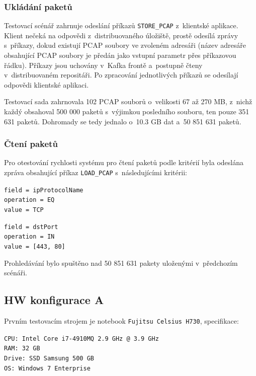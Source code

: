 \subsubsection{Ukládání paketů}
Testovací scénář zahrnuje odeslání příkazů \texttt{STORE\_PCAP} z~klientské aplikace. Klient nečeká na odpovědi z~distribuovaného úložiště, prostě odesílá zprávy s~příkazy, dokud existují PCAP soubory ve zvoleném adresáři (název adresáře obsahující PCAP soubory je předán jako vstupní parametr přes příkazovou řádku). Příkazy jsou uchovány v~Kafka frontě a~postupně čteny v~distribuovaném repositáři. Po zpracování jednotlivých příkazů se odesílají odpovědi klientské aplikaci.

Testovací sada zahrnovala 102 PCAP souborů o~velikosti 67 až 270 MB, z~nichž každý obsahoval 500 000 paketů s~výjimkou posledního souboru, ten pouze 351 631 paketů. Dohromady se tedy jednalo o~10.3 GB dat a~50 851 631 paketů.

\subsubsection{Čtení paketů}
Pro otestování rychlosti systému pro čtení paketů podle kritérií byla odeslána zpráva obsahující příkaz \texttt{LOAD\_PCAP} s~následujícími kritérii:

\vspace{0.5cm}
\texttt{field = ipProtocolName} \\
\indent \texttt{operation = EQ} \\
\indent \texttt{value = TCP}

\vspace{0.5cm}
\texttt{field = dstPort} \\
\indent \texttt{operation = IN} \\
\indent \texttt{value = [443, 80]}

\vspace{0.5cm}
\noindent Prohledávání bylo spuštěno nad 50 851 631 pakety uloženými v~předchozím scénáři.

\subsection{HW konfigurace A}
Prvním testovacím strojem je notebook \texttt{Fujitsu Celsius H730}, specifikace:

\vspace{0.5cm}
\noindent \texttt{CPU: Intel Core i7-4910MQ 2.9 GHz @ 3.9 GHz} \\
\texttt{RAM: 32 GB} \\
\texttt{Drive: SSD Samsung 500 GB} \\
\texttt{OS: Windows 7 Enterprise}

